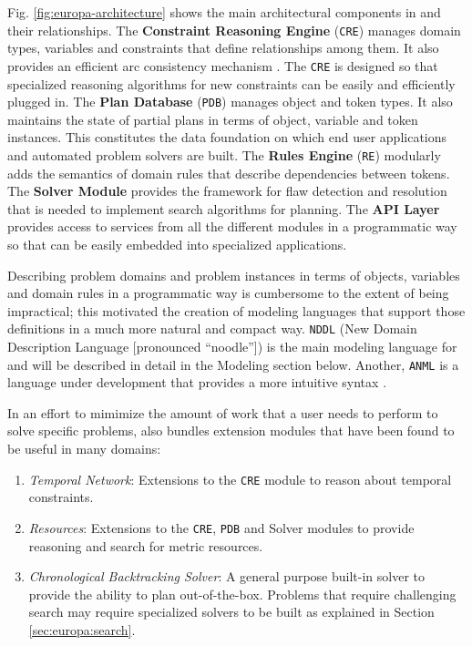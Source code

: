 Fig. \ref{fig:europa-architecture} shows the main architectural
components in \eu and their relationships. The \textbf{Constraint
  Reasoning Engine} (\texttt{CRE}) manages domain types, variables and
constraints that define relationships among them. It also provides an
efficient arc consistency mechanism \cite{mackworth77}. The
\texttt{CRE} is designed so that specialized reasoning algorithms for
new constraints can be easily and efficiently plugged in. The
\textbf{Plan Database} (\texttt{PDB}) manages object and token
types. It also maintains the state of partial plans in terms of
object, variable and token instances. This constitutes the data
foundation on which end user applications and automated problem solvers
 are built. The \textbf{Rules Engine} (\texttt{RE})
modularly adds the semantics of domain rules that describe
dependencies between tokens. The \textbf{Solver Module} provides the
framework for flaw detection and resolution that is needed to
implement search algorithms for planning. The \textbf{API Layer}
provides access to services from all the different modules in a
programmatic way so that \eu can be easily embedded into specialized
applications.

Describing problem domains and problem instances in terms of objects,
variables and domain rules in a programmatic way is cumbersome to the
extent of being impractical; this motivated the creation of modeling
languages that support those definitions in a much more natural and
compact way. \texttt{NDDL} (New Domain Description Language
[pronounced ``noodle'']) \cite{NDDL} is the main modeling language for
\eu and will be described in detail in the Modeling section
below. Another, \texttt{ANML} is a language under development that
provides a more intuitive syntax \cite{smith08}.
  
In an effort to mimimize the amount of work that a user needs to
perform to solve specific problems, \eu also bundles extension
modules that have been found to be useful in many domains:

\begin{enumerate}

\item \textit{Temporal Network}: Extensions to the \texttt{CRE} module to
  reason about temporal constraints.

\item \textit{Resources}: Extensions to the \texttt{CRE}, \texttt{PDB}
  and Solver modules to provide reasoning and search for metric
  resources.

\item \textit{Chronological Backtracking Solver}: A general purpose
  built-in solver to provide the ability to plan out-of-the-box.
  Problems that require challenging search may require specialized
  solvers to be built as explained in Section \ref{sec:europa:search}.

\end{enumerate}

